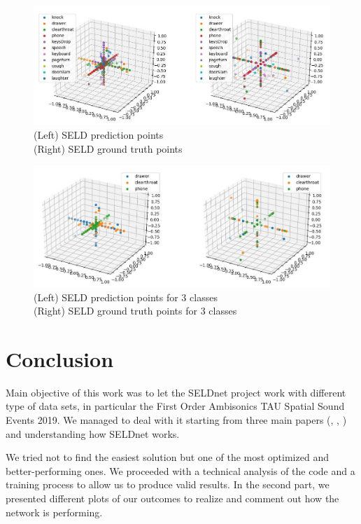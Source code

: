 \documentclass[11pt]{article}
\begin{document}
\newpage
\begin{figure}[h!]
	\centering
	\hspace*{-2.5cm}
	\includegraphics[width=17.7cm]{img/plot_labels.jpg}
	\caption{(Left) SELD prediction points\\ (Right) SELD ground truth points}
	\label{fig:plot_labels}
\end{figure}

\begin{figure}[h!]
	\centering
	\hspace*{-2.5cm}
	\includegraphics[width=17.7cm]{img/plot_3labels.jpg}
	\caption{(Left) SELD prediction points for 3 classes\\ (Right) SELD ground truth points for 3 classes}
	\label{fig:plot_3labels}
\end{figure}


\newpage
\section{Conclusion}\label{cha:conc}

Main objective of this work was to let the SELDnet project work with different type of data sets, in particular the First Order Ambisonics TAU Spatial Sound Events 2019. We managed to deal with it starting from three main papers (\cite{paper2020}, \cite{paper2019}, \cite{paper2018}) and understanding how SELDnet works.

\noindent
We tried not to find the easiest solution but one of the most optimized and better-performing ones. We proceeded with a technical analysis of the code and a training process to allow us to produce valid results. In the second part, we presented different plots of our outcomes to realize and comment out how the network is performing. 
\end{document}
